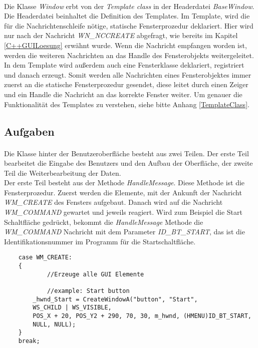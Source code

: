 \paragraph{}
Die Klasse \textit{Window} erbt von der \textit{Template class} in der Headerdatei \textit{BaseWindow}. Die Headerdatei beinhaltet die Definition des Templates. Im Template, wird die für die Nachrichtenschleife nötige, statische Fensterprozedur deklariert. Hier wird nur nach der Nachricht \textit{WN\_NCCREATE} abgefragt, wie bereits im Kapitel \ref{C++GUILoesung} erwähnt wurde. Wenn die Nachricht empfangen worden ist, werden die weiteren Nachrichten an das Handle des Fensterobjekts weitergeleitet. In dem Template wird außerdem auch eine Fensterklasse deklariert, registriert und danach erzeugt. Somit werden alle Nachrichten eines Fensterobjektes immer zuerst an die statische Fensterprozedur gesendet, diese leitet durch einen Zeiger und ein Handle die Nachricht an das korrekte Fenster weiter. Um genauer die Funktionalität des Templates zu verstehen, siehe bitte Anhang \ref{TemplateClass}.

\subsection{Aufgaben}
\paragraph{}
Die Klasse hinter der Benutzeroberfläche besteht aus zwei Teilen. Der erste Teil bearbeitet die Eingabe des Benutzers und den Aufbau der Oberfläche, der zweite Teil die Weiterbearbeitung der Daten.\\

Der erste Teil besteht aus der Methode \textit{HandleMessage}. Diese Methode ist die Fensterprozedur. Zuerst  werden die Elemente, mit der Ankunft der Nachricht \textit{WM\_CREATE} des Fensters aufgebaut. Danach wird auf die Nachricht \textit{WM\_COMMAND} gewartet und jeweils reagiert. Wird zum Beispiel die Start Schaltfläche gedrückt, bekommt die \textit{HandleMessage} Methode die \textit{WM\_COMMAND} Nachricht mit dem Parameter \textit{ID\_BT\_START}, das ist die Identifikationsnummer im Programm für die Startschaltfläche.\\

\begin{lstlisting}	 
	case WM_CREATE:
	{
    		//Erzeuge alle GUI Elemente
    
    		//example: Start button
		_hwnd_Start = CreateWindowA("button", "Start",
   		WS_CHILD | WS_VISIBLE,
   		POS_X + 20, POS_Y2 + 290, 70, 30, m_hwnd, (HMENU)ID_BT_START,
   		NULL, NULL);
	}
	break;
\end{lstlisting}

